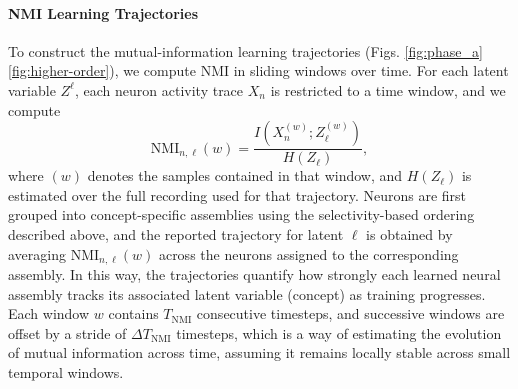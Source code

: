\documentclass{article}
\begin{document}
\paragraph{NMI Learning Trajectories}
To construct the mutual-information learning trajectories (Figs. \ref{fig:phase_a} \ref{fig:higher-order}), we compute NMI in sliding windows over time. For each latent variable $Z^\ell$, each neuron activity trace $X_n$ is restricted to a time window, and we compute
\[
\mathrm{NMI}_{n,\ell}(w)
=
\frac{I(X_n^{(w)}; Z_\ell^{(w)})}{H(Z_\ell)},
\]
where $(w)$ denotes the samples contained in that window, and \(H(Z_\ell)\) is estimated over the full recording used for that trajectory. Neurons are first grouped into concept-specific assemblies using the selectivity-based ordering described above, and the reported trajectory for latent $\ell$ is obtained by averaging $\mathrm{NMI}_{n,\ell}(w)$ across the neurons assigned to the corresponding assembly. In this way, the trajectories quantify how strongly each learned neural assembly tracks its associated latent variable (concept) as training progresses. Each window \(w\) contains \(T_\textrm{NMI}\) consecutive timesteps, and successive windows are offset by a stride of \(\Delta T_\textrm{NMI}\) timesteps, which is a way of estimating the evolution of mutual information across time, assuming it remains locally stable across small temporal windows.
\end{document}
